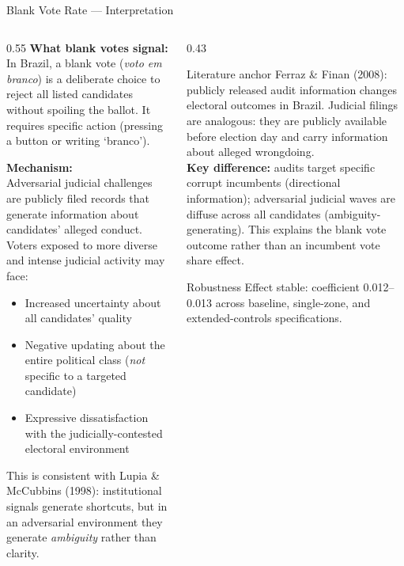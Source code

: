 \documentclass[aspectratio=169,10pt]{beamer}
\begin{document}
\begin{frame}{Blank Vote Rate --- Interpretation}
\begin{columns}[T]
\begin{column}{0.55\textwidth}
\textbf{What blank votes signal:}\\
In Brazil, a blank vote (\emph{voto em branco}) is a deliberate choice to reject all listed candidates without spoiling the ballot. It requires specific action (pressing a button or writing `branco').
\bigskip

\textbf{Mechanism:}\\
Adversarial judicial challenges are publicly filed records that generate information about candidates' alleged conduct. Voters exposed to more diverse and intense judicial activity may face:
\begin{itemize}
  \item Increased uncertainty about all candidates' quality
  \item Negative updating about the entire political class (\emph{not} specific to a targeted candidate)
  \item Expressive dissatisfaction with the judicially-contested electoral environment
\end{itemize}
\bigskip
This is consistent with Lupia \& McCubbins (1998): institutional signals generate shortcuts, but in an adversarial environment they generate \emph{ambiguity} rather than clarity.
\end{column}
\begin{column}{0.43\textwidth}
\begin{block}{Literature anchor}
  \footnotesize
  Ferraz \& Finan (2008): publicly released audit information changes electoral outcomes in Brazil. Judicial filings are analogous: they are publicly available before election day and carry information about alleged wrongdoing.\\[4pt]
  \textbf{Key difference:} audits target specific corrupt incumbents (directional information); adversarial judicial waves are diffuse across all candidates (ambiguity-generating). This explains the blank vote outcome rather than an incumbent vote share effect.
\end{block}
\bigskip
\begin{block}{Robustness}
  \footnotesize
  Effect stable: coefficient 0.012--0.013 across baseline, single-zone, and extended-controls specifications.
\end{block}
\end{column}
\end{columns}
\end{frame}
\end{document}
